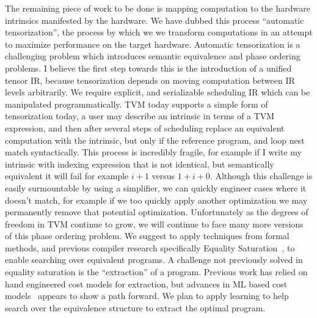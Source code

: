 The remaining piece of work to be done is mapping
    computation to the hardware intrinsics manifested by the hardware.
We have dubbed this process ``automatic tensorization'', the process by which we
    we transform computations in an attempt to maximize performance on the target
    hardware.
Automatic tensorization is a challenging problem which introduces
    semantic equivalence and phase ordering problems.
I believe the first step towards this is the introduction of a unified
    tensor IR, because tensorization depends on moving computation between
    IR levels arbitrarily.
We require explicit, and serializable scheduling IR which can be manipulated
    programmatically.
TVM today supports a simple form of tensorization today, a user may describe
    an intrinsic in terms of a TVM expression, and then after several steps
    of scheduling replace an equivalent computation with the intrinsic,
    but only if the reference program, and loop nest match syntactically.
This process is incredibly fragile, for example if I write my intrinsic with
    indexing expression that is not identical, but semantically equivalent
    it will fail for example $i + 1$ versus $1 + i + 0$.
Although this challenge is easily surmountable by using a simplifier,
    we can quickly engineer cases where it doesn't match, for example
    if we too quickly apply another optimization we may permanently
    remove that potential optimization.
Unfortunately as the degrees of freedom in TVM continue to grow, we
    will continue to face many more versions of this phase ordering
    problem.
We suggest to apply techniques from formal methods, and previous compiler
    research specifically Equality Saturation~\cite{eqsat}, to enable searching
    over equivalent programs.
A challenge not previously solved in equality saturation is the ``extraction''
    of a program.
Previous work has relied on hand engineered cost models for extraction, but
    advances in ML based cost models~\cite{autotvm} appears to show a path
    forward.
We plan to apply learning to help search over the equivalence structure to
    extract the optimal program.
